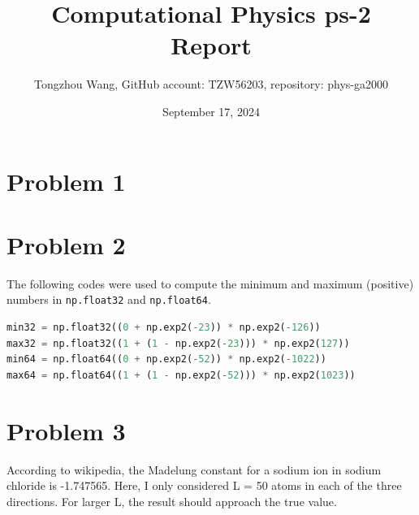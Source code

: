 \documentclass[11pt]{article}
\title{Computational Physics ps-2 Report}
\author{Tongzhou Wang, GitHub account: TZW56203, repository: phys-ga2000}
\date{September 17, 2024}
\begin{document}
\maketitle

\section{Problem 1}


\section{Problem 2}


The following codes were used to compute the minimum and maximum (positive) numbers in \texttt{np.float32} and \texttt{np.float64}.

\lstset{style = mystyle}
\begin{lstlisting}[language=Python]
min32 = np.float32((0 + np.exp2(-23)) * np.exp2(-126))
max32 = np.float32((1 + (1 - np.exp2(-23))) * np.exp2(127))
min64 = np.float64((0 + np.exp2(-52)) * np.exp2(-1022))
max64 = np.float64((1 + (1 - np.exp2(-52))) * np.exp2(1023))
\end{lstlisting}

\section{Problem 3}
\lstset{style = txtstyle}


According to wikipedia, the Madelung constant for a sodium ion in sodium chloride is -1.747565. Here, I only considered L = 50 atoms in each of the three directions. For larger L, the result should approach the true value.
\end{document}
